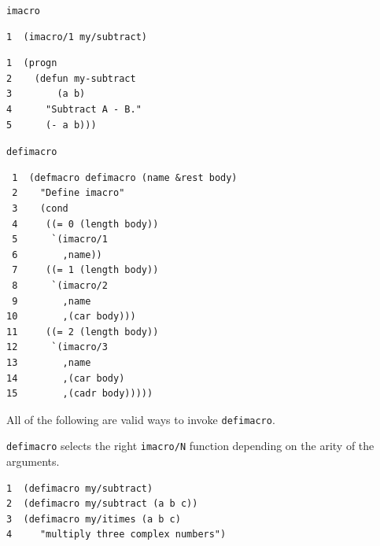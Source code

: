 \documentclass[presentation]{beamer}
\begin{document}
\begin{frame}[label={sec:org5716501},fragile]{\texttt{imacro}}
\begin{verbatim}
1  (imacro/1 my/subtract)
\end{verbatim}

\begin{verbatim}
1  (progn
2    (defun my-subtract
3        (a b)
4      "Subtract A - B."
5      (- a b)))
\end{verbatim}

\texttt{defimacro}

\begin{verbatim}
 1  (defmacro defimacro (name &rest body)
 2    "Define imacro"
 3    (cond
 4     ((= 0 (length body))
 5      `(imacro/1
 6        ,name))
 7     ((= 1 (length body))
 8      `(imacro/2
 9        ,name
10        ,(car body)))
11     ((= 2 (length body))
12      `(imacro/3
13        ,name
14        ,(car body)
15        ,(cadr body)))))
\end{verbatim}

All of the following are valid ways to invoke \texttt{defimacro}.

\texttt{defimacro} selects the right \texttt{imacro/N} function depending on the arity of the arguments.

\begin{verbatim}
1  (defimacro my/subtract)
2  (defimacro my/subtract (a b c))
3  (defimacro my/itimes (a b c)
4     "multiply three complex numbers")
\end{verbatim}
\end{frame}
\end{document}
